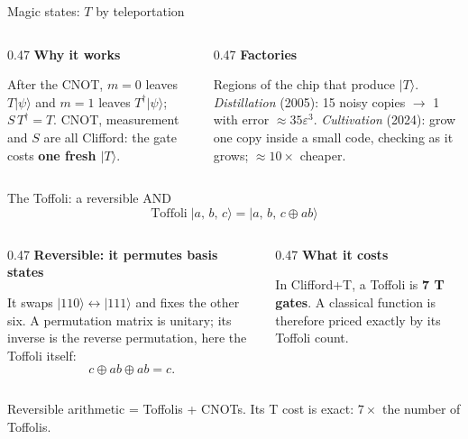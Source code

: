 \documentclass[aspectratio=169,11pt]{beamer}
\newcommand{\blocktitle}[1]{{\bfseries #1}\par\vskip1mm}
\newcommand{\oplusat}[2]{\draw[thick,color=body] (#1,#2) circle (1.6mm);
  \draw[thick,color=body] (#1-0.16,#2) -- (#1+0.16,#2); \draw[thick,color=body] (#1,#2-0.16) -- (#1,#2+0.16);}
\begin{document}
\begin{frame}{Magic states: $T$ by teleportation}
  \centering
  \vskip3mm
  \begin{columns}[T]
    \begin{column}{0.47\textwidth}
      \blocktitle{Why it works}
      After the CNOT, $m=0$ leaves $T|\psi\rangle$ and $m=1$ leaves $T^\dagger|\psi\rangle$; $S\,T^\dagger=T$. CNOT, measurement and $S$ are all Clifford: the gate costs \textbf{one fresh $|T\rangle$}.
    \end{column}
    \begin{column}{0.47\textwidth}
      \blocktitle{Factories}
      Regions of the chip that produce $|T\rangle$. \emph{Distillation} (2005): 15 noisy copies $\to$ 1 with error $\approx35\varepsilon^3$. \emph{Cultivation} (2024): grow one copy inside a small code, checking as it grows; $\approx10\times$ cheaper.
    \end{column}
  \end{columns}
\end{frame}

\begin{frame}{The Toffoli: a reversible AND}
  \[ \mathrm{Toffoli}\;|a,\,b,\,c\rangle = |a,\,b,\,c\oplus ab\rangle \]
  \vskip1mm
  \begin{columns}[T]
    \begin{column}{0.47\textwidth}
      \blocktitle{Reversible: it permutes basis states}
      It swaps $|110\rangle\leftrightarrow|111\rangle$ and fixes the other six. A permutation matrix is unitary; its inverse is the reverse permutation, here the Toffoli itself:
      \[ c\oplus ab\oplus ab=c . \]
    \end{column}
    \begin{column}{0.47\textwidth}
      \blocktitle{What it costs}
      In Clifford+T, a Toffoli is \textbf{7 T gates}. A classical function is therefore priced exactly by its Toffoli count.
    \end{column}
  \end{columns}
  \begin{takeaway}Reversible arithmetic = Toffolis + CNOTs. Its T cost is exact: $7\times$ the number of Toffolis.\end{takeaway}
\end{frame}
\end{document}
